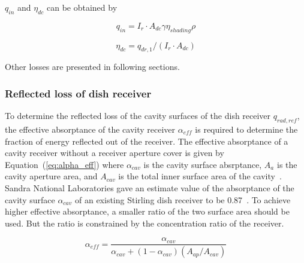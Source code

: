 \documentclass{article}
\begin{document}
$q_{in}$ and $\eta_{dc}$ can be obtained by

\begin{equation}
	q_{in}=I_r\cdot A_{dc}\gamma\eta_{shading}\rho
	\label{eq:q_in}
\end{equation}

\begin{equation}
	\eta_{dc}=q_{dr,1}/\left(I_r\cdot A_{dc}\right)
	\label{eq:eta_dc}
\end{equation}

Other losses are presented in following sections.

\subsubsection{Reflected loss of dish receiver}
To determine the reflected loss of the cavity surfaces of the dish receiver $q_{rad,ref}$, the effective absorptance of the cavity receiver $\alpha_{eff}$ is required to determine the fraction of energy reflected out of the receiver. The effective absorptance of a cavity receiver without a receiver aperture cover is given by Equation~(\ref{eq:alpha_eff}) where $\alpha_{cav}$ is the cavity surface absrptance, $A_a$ is the cavity aperture area, and $A_{cav}$ is the total inner surface area of the cavity~\cite{Duffie2013}. Sandra National Laboratories gave an estimate value of the absorptance of the cavity surface $\alpha_{cav}$ of an existing Stirling dish receiver to be 0.87~\cite{Hogan1994}. To achieve higher effective absorptance, a smaller ratio of the two surface area should be used. But the ratio is constrained by the concentration ratio of the receiver.

\begin{equation}
	\alpha_{eff}=\dfrac{\alpha_{cav}}{\alpha_{cav}+\left(1-\alpha_{cav}\right)\left(A_{ap}/A_{cav}\right)}
	\label{eq:alpha_eff}
\end{equation}
\end{document}
